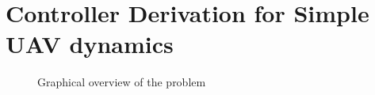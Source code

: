 \section{Controller Derivation for Simple UAV dynamics}
\begin{figure}[thpb]
	\centering
	\caption{Graphical overview of the problem}
	\label{overview}
\end{figure}

